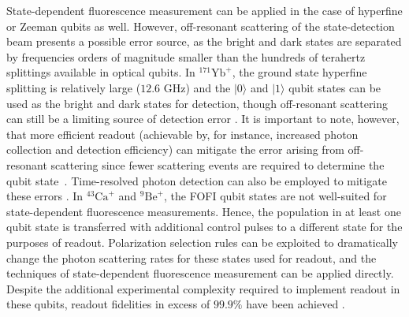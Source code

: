 \documentclass[%
12pt,
 amsmath,amssymb,
]{revtex4-2}
\begin{document}
State-dependent fluorescence measurement can be applied in the case of hyperfine or Zeeman qubits as well. However, off-resonant scattering of the state-detection beam presents a possible error source, as the bright and dark states are separated by frequencies orders of magnitude smaller than the hundreds of terahertz splittings available in optical qubits. In $^{171}\mathrm{Yb}^{+}$, the ground state hyperfine splitting is relatively large ($12.6$ GHz) and the $|0\rangle$ and  $|1\rangle$ qubit states can be used as the bright and dark states for detection, though off-resonant scattering can still be a limiting source of detection error \cite{noek2013high}. It is important to note, however, that more efficient readout (achievable by, for instance, increased photon collection and detection efficiency) can mitigate the error arising from off-resonant scattering since fewer scattering events are required to determine the qubit state~\cite{CrainSNSPDdetect2019}. Time-resolved photon detection can also be employed to mitigate these errors \cite{WolkTimeResolvedDetect2015}.  In $^{43}\mathrm{Ca}^{+}$ and $^{9}\mathrm{Be}^{+}$, the FOFI qubit states are not well-suited for state-dependent fluorescence measurements.  Hence, the population in at least one qubit state is transferred with additional control pulses to a different state for the purposes of readout. Polarization selection rules can be exploited to dramatically change the photon scattering rates for these states used for readout, and the techniques of state-dependent fluorescence measurement can be applied directly. Despite the additional experimental complexity required to implement readout in these qubits, readout fidelities in excess of $99.9 \%$ have been achieved \cite{HartyHighFidelityIons2014}.
\end{document}
